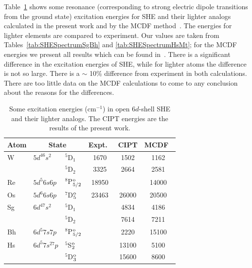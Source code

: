 \documentclass[10pt,a4paper, twoside]{report}
\begin{document}
Table~\ref{tab:EE} shows some resonance (corresponding to strong electric dipole transitions from the ground state) excitation energies for SHE and their lighter analogs calculated in the present work and by the MCDF method~\cite{MCDF-Sg,MCDF-BhHs}. The energies for lighter elements are compared to experiment. Our values are taken from Tables~\ref{tab:SHESpectrumSgBh} and \ref{tab:SHESpectrumHsMt}; for the MCDF energies we present all results which can be found in~\cite{MCDF-Sg,MCDF-BhHs}. There is  a significant difference in the excitation energies of SHE, while for lighter atoms the difference is not so large. There is a $\sim$ 10\% difference from experiment in both calculations. There are too little data on the MCDF calculations to come to any conclusion about the reasons for the differences. %
\begin{table}[h]
\caption[Some excitation energies in open $6d$-shell SHE and each lighter analog]{Some excitation energies (cm$^{-1}$) in open $6d$-shell SHE and their lighter analogs. The CIPT energies are the results of the present work.   \label{tab:EE}}
\begin{tabular}{lllccc}
\toprule
\toprule
Atom &  \multicolumn{2}{c}{State} &  Expt.~\cite{NIST_ASD}   & CIPT  & MCDF~\cite{MCDF-Sg,MCDF-BhHs} \\
\midrule

W  & $5d^46s^2$ & $^5$D$_1$ & 1670 &1502 & 1162 \\
      &                      & $^5$D$_2$ & 3325 & 2664 & 2581 \\

Re    & $5d^5 6s6p$ &  $^8$P$^{\rm o}_{5/2}$   &  18950  &    & 14000  \\

Os    & $5d^6 6s6p$ &  $^7$D$^{\rm o}_{5}$  & 23463  &  26000  &  20500 \\

Sg  & $6d^47s^2$ & $^5$D$_1$ &         &4834 & 4186 \\
      &                      & $^5$D$_2$ &        & 7614 & 7211 \\

Bh    & $6d^5 7s7p$ &  $^8$P$^{\rm o}_{5/2}$   &    & 2220   & 15100  \\

Hs    & $6d^5 7s^27p$ &  $^5$S$^{\rm o}_{2}$  &   &  13100  &  5100 \\
        &                           &  $^5$D$^{\rm o}_{3}$  &   &  15600  &  8600 \\

\bottomrule
\bottomrule
\end{tabular}
\end{table}
\end{document}

